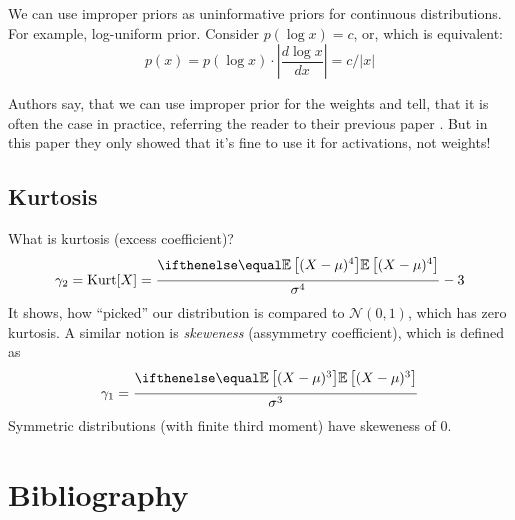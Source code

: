 \documentclass{article}
\begin{document}
We can use improper priors as uninformative priors for continuous distributions.
For example, log-uniform prior.
Consider $p(\log x) = c$, or, which is equivalent:
\[
p(x) = p(\log x) \cdot \left|\frac{d\log x}{dx}\right| = c / |x|
\]

Authors say, that we can use improper prior for the weights and tell, that it is often the case in practice, referring the reader to their previous paper \cite{Information_Dropout}.
But in this paper they only showed that it's fine to use it for activations, not weights!

\subsection*{Kurtosis}
What is kurtosis (excess coefficient)?
\[
\gamma_2 = \text{Kurt}[X] = \frac{\expect{(X - \mu)^4}}{\sigma^4} - 3
\]
It shows, how ``picked'' our distribution is compared to $\mathcal{N}(0,1)$, which has zero kurtosis.
A similar notion is \textit{skeweness} (assymmetry coefficient), which is defined as
\[
\gamma_1 = \frac{\expect{(X - \mu)^3}}{\sigma^3}
\]
Symmetric distributions (with finite third moment) have skeweness of 0.


\section{Bibliography}
\printbibliography
\end{document}
